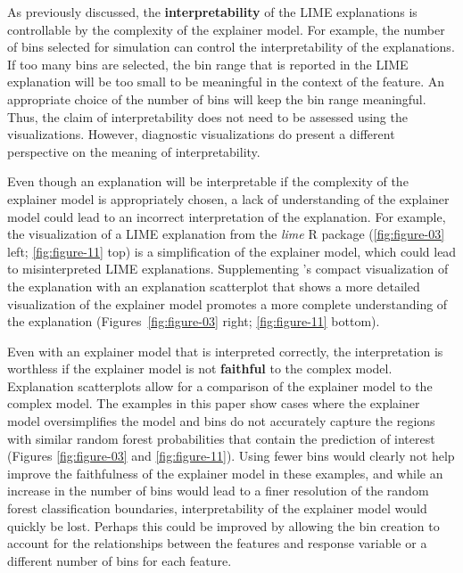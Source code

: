 \documentclass[AMS,STIX2COL]{WileyNJD-v2}\usepackage[]{graphicx}\usepackage[]{color}
\begin{document}
As previously discussed, the \textbf{interpretability} of the LIME explanations is controllable  by the complexity of the explainer model. For example, the number of bins selected for simulation can control the interpretability of the explanations. If too many bins are selected, the bin range that is reported in the LIME explanation will be too small to be meaningful in the context of the feature. An appropriate choice of the number of bins will keep the bin range meaningful. Thus, the claim of interpretability does not need to be assessed using the visualizations. However, diagnostic visualizations do present a different perspective on the meaning of interpretability.

Even though an explanation will be interpretable if  the complexity of the explainer model is appropriately chosen, a lack of understanding of the explainer model  could lead to an incorrect interpretation of the explanation. For example, the visualization of a LIME explanation  from the \emph{lime} R package \citep{pedersen:2020} (\autoref{fig:figure-03} left;   \autoref{fig:figure-11} top) is a  simplification of the explainer model, which could lead to  misinterpreted LIME explanations. Supplementing \citet{pedersen:2020}'s compact visualization of the explanation with an explanation scatterplot that shows a more detailed visualization of the explainer model promotes a more complete understanding of the explanation (Figures~\ref{fig:figure-03} right;   \ref{fig:figure-11} bottom).

Even with an explainer model that is interpreted correctly, the interpretation is worthless if the explainer model is not \textbf{faithful} to the complex model.  Explanation scatterplots allow for a comparison of the explainer model to the complex model. The examples in this paper show cases where the explainer model oversimplifies the model and bins do not accurately capture the regions with similar random forest probabilities that contain the prediction of interest (Figures \ref{fig:figure-03} and \ref{fig:figure-11}). Using fewer bins would clearly not help improve the faithfulness of the explainer model in these examples, and while an increase in the number of bins would lead to a finer resolution of the random forest classification boundaries, interpretability of the explainer model would quickly be lost. Perhaps this could be improved by allowing the bin creation to account for the relationships between the features and response variable or a different number of bins for each feature.
\end{document}
